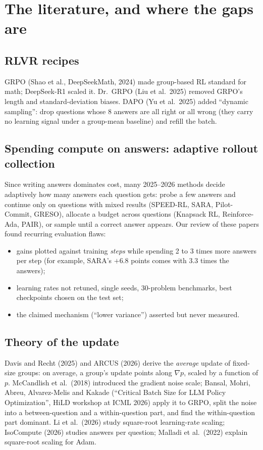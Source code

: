 \documentclass[11pt]{article}
\begin{document}
\section{The literature, and where the gaps are}\label{sec:lit}

\subsection{RLVR recipes}
GRPO (Shao et al., DeepSeekMath, 2024) made group-based RL standard for math; DeepSeek-R1 scaled it. Dr.\ GRPO (Liu et al.\ 2025) removed GRPO's length and standard-deviation biases. DAPO (Yu et al.\ 2025) added ``dynamic sampling'': drop questions whose 8 answers are all right or all wrong (they carry no learning signal under a group-mean baseline) and refill the batch.

\subsection{Spending compute on answers: adaptive rollout collection}
Since writing answers dominates cost, many 2025--2026 methods decide adaptively how many answers each question gets: probe a few answers and continue only on questions with mixed results (SPEED-RL, SARA, Pilot-Commit, GRESO), allocate a budget across questions (Knapsack RL, Reinforce-Ada, PAIR), or sample until a correct answer appears. Our review of these papers found recurring evaluation flaws:
\begin{itemize}[leftmargin=*,itemsep=1pt]
\item gains plotted against training \emph{steps} while spending 2 to 3 times more answers per step (for example, SARA's $+6.8$ points comes with 3.3 times the answers);
\item learning rates not retuned, single seeds, 30-problem benchmarks, best checkpoints chosen on the test set;
\item the claimed mechanism (``lower variance'') asserted but never measured.
\end{itemize}

\subsection{Theory of the update}
Davis and Recht (2025) and ARCUS (2026) derive the \emph{average} update of fixed-size groups: on average, a group's update points along $\nabla p$, scaled by a function of $p$. McCandlish et al.\ (2018) introduced the gradient noise scale; Bansal, Mohri, Abreu, Alvarez-Melis and Kakade (``Critical Batch Size for LLM Policy Optimization'', HiLD workshop at ICML 2026) apply it to GRPO, split the noise into a between-question and a within-question part, and find the within-question part dominant. Li et al.\ (2026) study square-root learning-rate scaling; IsoCompute (2026) studies answers per question; Malladi et al.\ (2022) explain square-root scaling for Adam.
\end{document}
